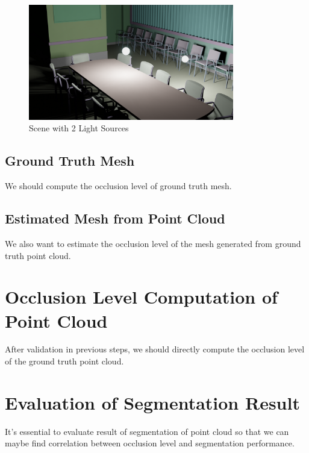 \documentclass[11pt, a4paper,oneside,chapterprefix=false]{scrbook}
\begin{document}
\noindent
\begin{minipage}{\textwidth}
	\begin{figure}[H]
		\centering
		\includegraphics*[width=0.8\textwidth]{figures/2 vp.png}
		\caption{Scene with 2 Light Sources}
		\label{fig:scene with 2 light sources}
	\end{figure}
\end{minipage}

\subsection{Ground Truth Mesh} \label{subsec:occlusion}

We should compute the occlusion level of ground truth mesh.

\subsection{Estimated Mesh from Point Cloud} \label{subsec:occlusion}

We also want to estimate the occlusion level of the mesh generated from ground truth point cloud.

\section{Occlusion Level Computation of Point Cloud} \label{sec:occlusion}

After validation in previous steps, we should directly compute the occlusion level of the ground truth point cloud.

\section{Evaluation of Segmentation Result} \label{sec:evaluation}

It's essential to evaluate result of segmentation of point cloud so that we can maybe find correlation between occlusion level and segmentation performance.
\end{document}
